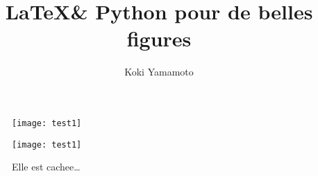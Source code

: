 \documentclass[10pt,a4paper,twoside]{article}
\author{Koki Yamamoto}
\title{\LaTeX \& Python pour de belles figures}
\begin{document}
\maketitle

\lipsum[1-4]

\begin{figure}[htb]
\begin{center}
\texttt{[image: test1]}
\end{center}
\end{figure}

\lipsum[1-4]


\begin{figure}[htb]
\begin{center}
\texttt{[image: test1]}
\caption{Elle est cachee\ldots}
\end{center}
\end{figure}

\lipsum[1-8]
\end{document}
